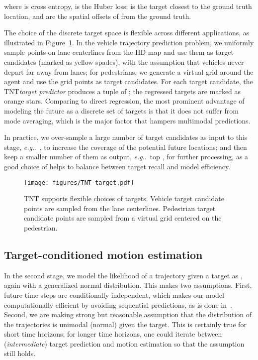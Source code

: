 \documentclass{article}
\makeatletter
\DeclareRobustCommand\onedot{\futurelet\@let@token\@onedot}
\def\@onedot{\ifx\@let@token.\else.\null\fi\xspace}
\newcommand{\model}{TNT\xspace}
\def\eg{\emph{e.g}\onedot} \def\Eg{\emph{E.g}\onedot}
\makeatother
\begin{document}
where  is cross entropy,  is the Huber loss;  is the target closest to the ground truth location, and  are the spatial offsets of  from the ground truth.


The choice of the discrete target space is flexible across different applications, as illustrated in Figure~\ref{fig:targets}. In the vehicle trajectory prediction problem, we uniformly sample points on lane centerlines from the HD map and use them as target candidates (marked as yellow spades), with the assumption that vehicles never depart far away from lanes; for pedestrians, we generate a virtual grid around the agent and use the grid points as target candidates.
For each target candidate, the \model \textit{target predictor} produces a tuple of ; the regressed targets are marked as orange stars.
Comparing to direct regression, the most prominent advantage of modeling the future as a discrete set of targets is that it does not suffer from mode averaging, which is the major factor that hampers multimodal predictions.


In practice, we over-sample a large number of target candidates as input to this stage, \eg~, to increase the coverage of the potential future locations; and then keep a smaller number of them as output, \eg~top , for further processing, as a good choice of  helps to balance between target recall and model efficiency.

\begin{figure}[t]
    \centering
    \texttt{[image: figures/TNT-target.pdf]}
    \caption{\model supports flexible choices of targets. Vehicle target candidate points are sampled from the lane centerlines. Pedestrian target candidate points are sampled from a virtual grid centered on the pedestrian.}
    \label{fig:targets}
\end{figure}

\subsection{Target-conditioned motion estimation}
\label{sec:stage2}
In the second stage, we model the likelihood of a trajectory given a target as , again with a generalized normal distribution.  This makes two assumptions. First, future time steps are conditionally independent, which makes our model computationally efficient by avoiding sequential predictions, as is done in~\cite{chai2019multipath,phan2019covernet,cui2019multimodal,mangalam2020not}.
Second, we are making strong but reasonable assumption that the distribution of the trajectories is unimodal (normal) given the target. This is certainly true for short time horizons;
for longer time horizons, one could iterate between (\textit{intermediate}) target prediction and motion estimation so that the assumption still holds.
\end{document}
